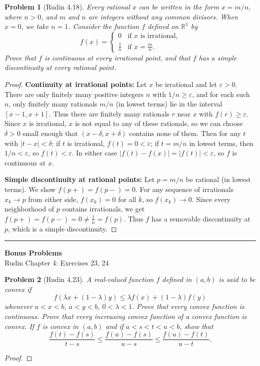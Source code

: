 \documentclass[12 pt]{article}        	%
\newtheorem{prob}{Problem}
\newcommand{\R}{\mathbb{R}}
\newcommand{\eps}{\varepsilon}
\begin{document}
\begin{prob}[Rudin 4.18]
Every rational $x$ can be written in the form $x = m/n$, where $n > 0$, and $m$ and $n$ are integers without any common divisors. When $x = 0$, we take $n = 1$. Consider the function $f$ defined on $\R^1$ by
\[
f(x) = \begin{cases} 0 & \text{if } x \text{ is irrational,}\\ \frac{1}{n} & \text{if } x = \frac{m}{n}.\end{cases}
\]
Prove that $f$ is continuous at every irrational point, and that $f$ has a simple discontinuity at every rational point.
\end{prob}
\begin{proof}
\textbf{Continuity at irrational points:} Let $x$ be irrational and let $\eps > 0$. There are only finitely many positive integers $n$ with $1/n \geq \eps$, and for each such $n$, only finitely many rationals $m/n$ (in lowest terms) lie in the interval $[x-1, x+1]$. Thus there are finitely many rationals $r$ near $x$ with $f(r) \geq \eps$. Since $x$ is irrational, $x$ is not equal to any of these rationals, so we can choose $\delta > 0$ small enough that $(x - \delta, x + \delta)$ contains none of them. Then for any $t$ with $|t - x| < \delta$: if $t$ is irrational, $f(t) = 0 < \eps$; if $t = m/n$ in lowest terms, then $1/n < \eps$, so $f(t) < \eps$. In either case $|f(t) - f(x)| = |f(t)| < \eps$, so $f$ is continuous at $x$.

\textbf{Simple discontinuity at rational points:} Let $p = m/n$ be rational (in lowest terms). We show $f(p+) = f(p-) = 0$. For any sequence of irrationals $x_k \to p$ from either side, $f(x_k) = 0$ for all $k$, so $f(x_k) \to 0$. Since every neighborhood of $p$ contains irrationals, we get $f(p+) = f(p-) = 0 \neq \frac{1}{n} = f(p)$. Thus $f$ has a removable discontinuity at $p$, which is a simple discontinuity.
\end{proof}

\newpage

\vspace{2em}
\hrule
\vspace{1em}

\begin{center}
    \textbf{\Large Bonus Problems}\\[0.5em]
    \large Rudin Chapter 4: Exercises 23, 24
\end{center}

\begin{prob}[Rudin 4.23]
A real-valued function $f$ defined in $(a,b)$ is said to be \emph{convex} if
\[
f(\lambda x + (1 - \lambda)y) \leq \lambda f(x) + (1 - \lambda)f(y)
\]
whenever $a < x < b$, $a < y < b$, $0 < \lambda < 1$. Prove that every convex function is continuous. Prove that every increasing convex function of a convex function is convex. If $f$ is convex in $(a,b)$ and if $a < s < t < u < b$, show that
\[
\frac{f(t) - f(s)}{t - s} \leq \frac{f(u) - f(s)}{u - s} \leq \frac{f(u) - f(t)}{u - t}.
\]
\end{prob}
\begin{proof}

\end{proof}
\end{document}
